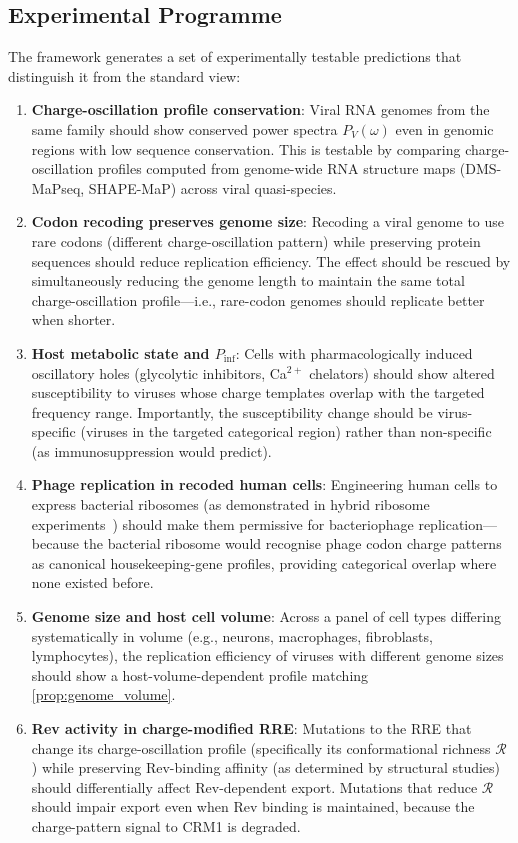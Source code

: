 \documentclass[11pt,twocolumn,a4paper]{article}
\theoremstyle{definition}
\theoremstyle{remark}
\newcommand{\Rcat}{\mathcal{R}}
\begin{document}
\subsection{Experimental Programme}

The framework generates a set of experimentally testable predictions that distinguish it from the standard view:

\begin{enumerate}[(P1)]
  \item \textbf{Charge-oscillation profile conservation}: Viral RNA genomes from the same family should show conserved power spectra $P_V(\omega)$ even in genomic regions with low sequence conservation. This is testable by comparing charge-oscillation profiles computed from genome-wide RNA structure maps (DMS-MaPseq, SHAPE-MaP) across viral quasi-species.

  \item \textbf{Codon recoding preserves genome size}: Recoding a viral genome to use rare codons (different charge-oscillation pattern) while preserving protein sequences should reduce replication efficiency. The effect should be rescued by simultaneously reducing the genome length to maintain the same total charge-oscillation profile---i.e., rare-codon genomes should replicate better when shorter.

  \item \textbf{Host metabolic state and $P_{\mathrm{inf}}$}: Cells with pharmacologically induced oscillatory holes (glycolytic inhibitors, Ca$^{2+}$ chelators) should show altered susceptibility to viruses whose charge templates overlap with the targeted frequency range. Importantly, the susceptibility change should be virus-specific (viruses in the targeted categorical region) rather than non-specific (as immunosuppression would predict).

  \item \textbf{Phage replication in recoded human cells}: Engineering human cells to express bacterial ribosomes (as demonstrated in hybrid ribosome experiments~\cite{Schmied2014}) should make them permissive for bacteriophage replication---because the bacterial ribosome would recognise phage codon charge patterns as canonical housekeeping-gene profiles, providing categorical overlap where none existed before.

  \item \textbf{Genome size and host cell volume}: Across a panel of cell types differing systematically in volume (e.g., neurons, macrophages, fibroblasts, lymphocytes), the replication efficiency of viruses with different genome sizes should show a host-volume-dependent profile matching \cref{prop:genome_volume}.

  \item \textbf{Rev activity in charge-modified RRE}: Mutations to the RRE that change its charge-oscillation profile (specifically its conformational richness $\Rcat$) while preserving Rev-binding affinity (as determined by structural studies) should differentially affect Rev-dependent export. Mutations that reduce $\Rcat$ should impair export even when Rev binding is maintained, because the charge-pattern signal to CRM1 is degraded.
\end{enumerate}
\end{document}
